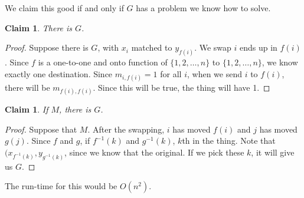 \documentclass[11pt]{article}
\newtheorem{claim}[theorem]{Claim}
\begin{document}
We claim this good if and only if $G$ has a problem we know how to solve.
\begin{claim} 
There is $G$. 
\end{claim}
\begin{proof}
Suppose there is $G$, with $x_{i}$ matched to $y_{f(i)}$. We swap $i$ ends up in $f(i)$. Since $f$ is a one-to-one and onto function of $\{1,2,\ldots,n\}$ to $\{1,2,\ldots,n\}$, we know exactly one destination. Since $m_{i,f(i)} = 1$ for all $i$, when we send $i$ to $f(i)$, there will be $m_{f(i),f(i)}$. Since this will be true, the thing will have 1.
\end{proof}
\begin{claim} 
If $M$, there is $G$. 
\end{claim}
\begin{proof}
Suppose that $M$. After the swapping, $i$ has moved $f(i)$ and $j$ has moved $g(j)$. Since $f$ and $g$, if $f^{-1}(k)$ and $g^{-1}(k)$, $k$th in the thing. Note that $(x_{f^{-1}(k)}, y_{g^{-1}(k)}$, since we know that the original. If we pick these $k$, it will give us $G$. 
\end{proof}

The run-time for this would be $O(n^2)$.
\end{document}
